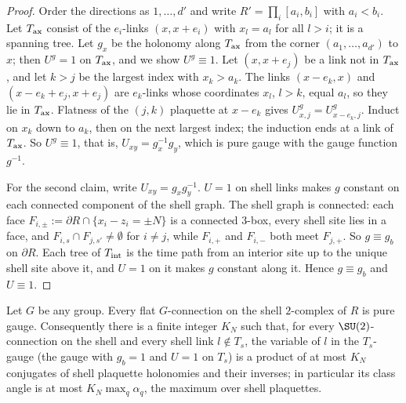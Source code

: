 \begin{proof}
Order the directions as $1,\dots,d'$ and write $R'=\prod_i[a_i,b_i]$ with $a_i<b_i$. Let $T_{\rm ax}$ consist of the $e_i$-links $(x,x+e_i)$ with $x_l=a_l$ for all $l>i$; it is a spanning tree. Let $g_x$ be the holonomy along $T_{\rm ax}$ from the corner $(a_1,\dots,a_{d'})$ to $x$; then $U^g=1$ on $T_{\rm ax}$, and we show $U^g\equiv1$. Let $(x,x+e_j)$ be a link not in $T_{\rm ax}$, and let $k>j$ be the largest index with $x_k>a_k$. The links $(x-e_k,x)$ and $(x-e_k+e_j,x+e_j)$ are $e_k$-links whose coordinates $x_l$, $l>k$, equal $a_l$, so they lie in $T_{\rm ax}$. Flatness of the $(j,k)$ plaquette at $x-e_k$ gives $U^g_{x,j}=U^g_{x-e_k,j}$. Induct on $x_k$ down to $a_k$, then on the next largest index; the induction ends at a link of $T_{\rm ax}$. So $U^g\equiv1$, that is, $U_{xy}=g_x^{-1}g_y$, which is pure gauge with the gauge function $g^{-1}$.

For the second claim, write $U_{xy}=g_xg_y^{-1}$. $U=1$ on shell links makes $g$ constant on each connected component of the shell graph. The shell graph is connected: each face $F_{i,\pm}:=\partial R\cap\{x_i-z_i=\pm N\}$ is a connected $3$-box, every shell site lies in a face, and $F_{i,s}\cap F_{j,s'}\ne\emptyset$ for $i\ne j$, while $F_{i,+}$ and $F_{i,-}$ both meet $F_{j,+}$. So $g\equiv g_b$ on $\partial R$. Each tree of $T_{\rm int}$ is the time path from an interior site up to the unique shell site above it, and $U=1$ on it makes $g$ constant along it. Hence $g\equiv g_b$ and $U\equiv1$.
\end{proof}

\begin{lemma}\label{pf:lem-shell}
Let $G$ be any group. Every flat $G$-connection on the shell $2$-complex of $R$ is pure gauge. Consequently there is a finite integer $K_N$ such that, for every $\SU(2)$-connection on the shell and every shell link $l\notin T_s$, the variable of $l$ in the $T_s$-gauge (the gauge with $g_b=1$ and $U=1$ on $T_s$) is a product of at most $K_N$ conjugates of shell plaquette holonomies and their inverses; in particular its class angle is at most $K_N\max_q\alpha_q$, the maximum over shell plaquettes.
\end{lemma}

